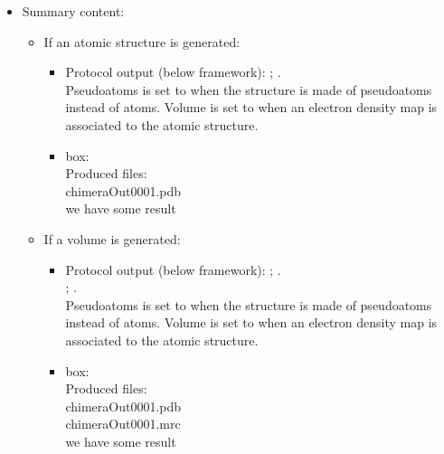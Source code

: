 \begin{itemize}
  \item Summary content:\\
  
   \begin{itemize}
    \item If an atomic structure is generated:\\

    \begin{itemize}
     \item Protocol output (below \scipion framework):
      ; .\\Pseudoatoms is set to  when the structure is made of pseudoatoms instead of atoms. Volume is set to  when an electron density map is associated to the atomic structure.\\
     \item {} box:\\Produced files:\\chimeraOut0001.pdb\\we have some result\\
    \end{itemize}
    \item If a volume is generated:\\
    
    \begin{itemize}
     \item Protocol output (below \scipion framework):
      ; .\\
      ; .\\Pseudoatoms is set to  when the structure is made of pseudoatoms instead of atoms. Volume is set to  when an electron density map is associated to the atomic structure.\\
     \item {} box:\\Produced files:\\chimeraOut0001.pdb\\chimeraOut0001.mrc\\we have some result\\
    \end{itemize}
    
   \end{itemize}
  
 \end{itemize}
